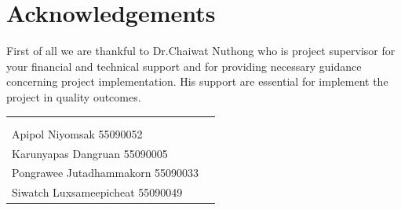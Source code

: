 \documentclass[11pt, oneside]{Thesis} %
\begin{document}
\clearpage %

\pagestyle{fancy}
\chapter{Acknowledgements}%
First of all we are thankful to Dr.Chaiwat Nuthong who is project supervisor for your financial and technical support and for providing necessary guidance concerning project implementation. His support are essential for implement the project in quality outcomes.
\begin{flushright}
	\begin{tabular}{ll}
		\\
		\\
		\\
		Apipol Niyomsak 55090052 \\
		Karunyapas Dangruan 55090005 \\
		Pongrawee Jutadhammakorn 55090033 \\
		Siwatch Luxsameepicheat 55090049 \\
	\end{tabular}
	
\end{flushright}
\clearpage %

\pagestyle{fancy} %

\tableofcontents %

\listoffigures %

\listoftables %
\end{document}
